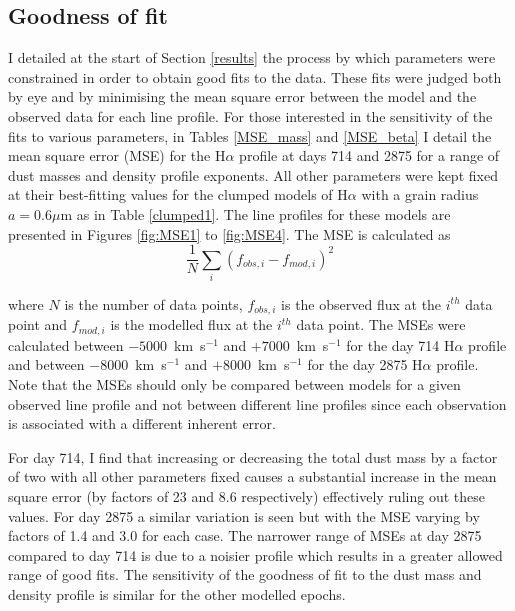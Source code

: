 \subsection{Goodness of fit}
I detailed at the start of Section \ref{results} the process by which parameters were constrained in order to obtain good fits to the data.  These fits were judged both by eye and by minimising the mean square error between the model and the observed data for each line profile.  For those interested in the sensitivity of the fits to various parameters, in Tables \ref{MSE_mass} and \ref{MSE_beta} I detail the mean square error (MSE) for the H$\alpha$ profile at days 714 and 2875 for a range of dust masses and density profile exponents.    All other parameters were kept fixed at their best-fitting values for the clumped models of H$\alpha$ with a grain radius $a=0.6\mu$m as in Table \ref{clumped1}.  The line profiles for these models are presented in Figures \ref{fig:MSE1} to \ref{fig:MSE4}.  The MSE is calculated as
\begin{equation}
\frac{1}{N} \sum_i (f_{obs,i} - f_{mod,i})^2
\end{equation}

where $N$ is the number of data points, $f_{obs,i}$ is the observed flux at the $i^{th}$ data point 
and $f_{mod,i}$ is the modelled flux at the $i^{th}$ data point. The MSEs were calculated between $-5000$~km~s$^{-1}$ and $+7000$~km~s$^{-1}$ for the day 714 H$\alpha$ profile and between $-8000$~km~s$^{-1}$ and $+8000$~km~s$^{-1}$ for the day 2875 H$\alpha$ profile.  Note that the MSEs should only be compared between models for a given observed line profile and not between different line profiles since each observation is associated with a different inherent error.

For day 714, I find that increasing or decreasing the total dust mass by a factor of two with all other parameters fixed causes a substantial increase in the mean square error (by factors of 23 and 8.6 respectively) effectively ruling out these values.  For day 2875 a similar variation is seen but with the MSE varying by factors of 1.4 and 3.0 for each case.  The narrower range of MSEs at day 2875 compared to day 714 is due to a noisier profile which results in a greater allowed range of good fits.   The sensitivity of the goodness of fit to the dust mass and density profile is similar for the other modelled epochs.


